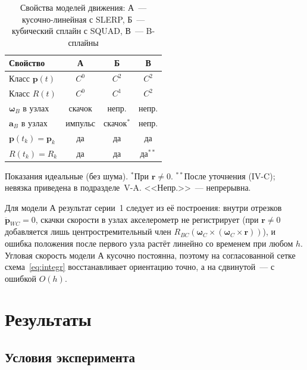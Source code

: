 \documentclass{misisarticle}
\newcommand{\vb}[1]{\mathbf{#1}}
\begin{document}
\begin{table}[htbp]
  \caption{Свойства моделей движения: А~--- кусочно-линейная с SLERP, Б~--- кубический сплайн с SQUAD, В~--- B-сплайны}
  \label{tab:models}
  \centering
  \small
  \begin{tabular}{lccc}
    \toprule
    \textbf{Свойство} & \textbf{А} & \textbf{Б} & \textbf{В} \\
    \midrule
    Класс $\vb p(t)$ & $C^0$ & $C^2$ & $C^2$ \\
    Класс $R(t)$ & $C^0$ & $C^1$ & $C^2$ \\
    $\boldsymbol\omega_B$ в узлах & скачок & непр. & непр. \\
    $\vb a_B$ в узлах & импульс & скачок$^{*}$ & непр. \\
    $\vb p(t_k)=\vb p_k$ & да & да & да \\
    $R(t_k)=R_k$ & да & да & да$^{**}$ \\
    \bottomrule
  \end{tabular}

  \smallskip
  {\footnotesize Показания идеальные (без шума). $^{*}$При $\vb r\neq0$. $^{**}$После уточнения (IV-C); невязка приведена в подразделе~V-A. <<Непр.>>~--- непрерывна.}
\end{table}


Для модели А результат серии~1 следует из её построения: внутри отрезков $\ddot{\vb p}_{WC}=0$, скачки скорости в узлах акселерометр не регистрирует (при $\vb r\neq0$ добавляется лишь центростремительный член $R_{BC}(\boldsymbol\omega_C\times(\boldsymbol\omega_C\times\vb r))$), и ошибка положения после первого узла растёт линейно со временем при любом $h$. Угловая скорость модели А кусочно постоянна, поэтому на согласованной сетке схема~\eqref{eq:integr} восстанавливает ориентацию точно, а на сдвинутой~--- с ошибкой $O(h)$.

\section{Результаты}

\subsection{Условия эксперимента}
\end{document}
